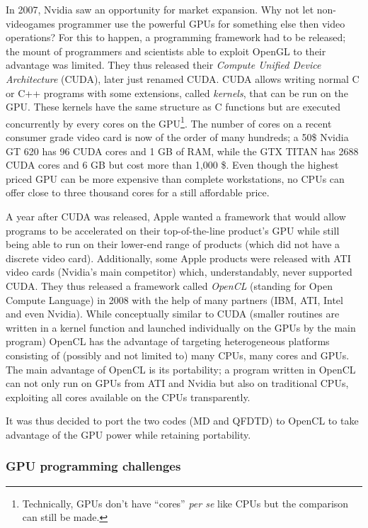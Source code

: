In 2007, Nvidia saw an opportunity for market expansion. Why not let
non-videogames programmer use the powerful GPUs for something else then video
operations? For this to happen, a programming framework had to be released; the
mount of programmers and scientists able to exploit OpenGL to their advantage
was limited. They thus released their \textit{Compute Unified Device
Architecture} (CUDA), later just renamed CUDA. CUDA allows writing normal C or
C++ programs with some extensions, called \textit{kernels}, that can be run on
the GPU. These kernels have the same structure as C functions but are executed
concurrently by every cores on the GPU\footnote{Technically, GPUs don't have
``cores'' \textit{per se} like CPUs but the comparison can still be made.}. The
number of cores on a recent consumer grade video card is now of the order of
many hundreds; a 50\$ Nvidia GT 620 has 96 CUDA cores and 1 GB of RAM, while the
GTX TITAN has 2688 CUDA cores and 6 GB but cost more than 1,000 \$. Even though
the highest priced GPU can be more expensive than complete workstations, no CPUs
can offer close to three thousand cores for a still affordable price.

A year after CUDA was released, Apple wanted a framework that would allow
programs to be accelerated on their top-of-the-line product's GPU while still
being able to run on their lower-end range of products (which did not have a
discrete video card). Additionally, some Apple products were released with ATI
video cards (Nvidia's main competitor) which, understandably, never supported
CUDA. They thus released a framework called \textit{OpenCL} (standing for
Open Compute Language) in 2008 with the help of many partners (IBM, ATI, Intel
and even Nvidia). While conceptually similar to CUDA (smaller routines are
written in a kernel function and launched individually on the GPUs by the main
program) OpenCL has the advantage of targeting heterogeneous platforms
consisting of (possibly and not limited to) many CPUs, many cores and GPUs. The
main advantage of OpenCL is its portability; a program written in OpenCL can
not only run on GPUs from ATI and Nvidia but also on traditional CPUs,
exploiting all cores available on the CPUs transparently.

It was thus decided to port the two codes (MD and QFDTD) to OpenCL to take
advantage of the GPU power while retaining portability.


\subsubsection{GPU programming challenges}

